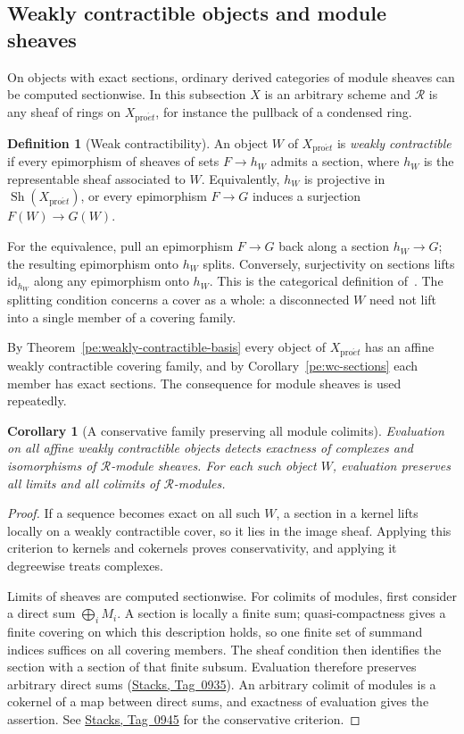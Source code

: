 \documentclass[11pt,a4paper]{article}
\numberwithin{equation}{section}
\newtheorem{corollary}[theorem]{Corollary}
\theoremstyle{definition}
\newtheorem{definition}[theorem]{Definition}
\theoremstyle{remark}
\newcommand{\Sh}{\operatorname{Sh}}
\newcommand{\proet}{\mathrm{pro}\acute{e}t}
\newcommand{\stacks}[1]{\href{https://stacks.math.columbia.edu/tag/#1}{\textnormal{Stacks, Tag~#1}}}
\begin{document}
\subsection{Weakly contractible objects and module sheaves}
\label{pe:sec-homological}

On objects with exact sections, ordinary derived categories of module
sheaves can be computed sectionwise. In this subsection $X$ is an
arbitrary scheme and $\mathcal R$ is any sheaf of rings on $X_{\proet}$,
for instance the pullback of a condensed ring.

\begin{definition}[Weak contractibility]\label{pe:weak-contractible}
An object $W$ of $X_{\proet}$ is \emph{weakly contractible} if every
epimorphism of sheaves of sets $F\to h_W$ admits a section, where $h_W$
is the representable sheaf associated to $W$. Equivalently, $h_W$ is
projective in $\Sh(X_{\proet})$, or every epimorphism $F\to G$ induces a
surjection $F(W)\to G(W)$.
\end{definition}

For the equivalence, pull an epimorphism $F\to G$ back along a section
$h_W\to G$; the resulting epimorphism onto $h_W$ splits. Conversely,
surjectivity on sections lifts $\mathrm{id}_{h_W}$ along any
epimorphism onto $h_W$. This is the categorical definition
of~\cite[\S3.2]{BS}. The splitting condition concerns a cover as a
whole: a disconnected $W$ need not lift into a single member of a
covering family.

By Theorem~\ref{pe:weakly-contractible-basis} every object of
$X_{\proet}$ has an affine weakly contractible covering family, and by
Corollary~\ref{pe:wc-sections} each member has exact sections. The
consequence for module sheaves is used repeatedly.

\begin{corollary}[A conservative family preserving all module colimits]
\label{pe:sections}
Evaluation on all affine weakly contractible objects detects exactness
of complexes and isomorphisms of $\mathcal R$-module sheaves.
For each such object $W$, evaluation preserves all limits and all
colimits of $\mathcal R$-modules.
\end{corollary}
\begin{proof}
If a sequence becomes exact on all such $W$, a section in a kernel
lifts locally on a weakly contractible cover, so it lies in the
image sheaf. Applying this criterion to kernels and cokernels proves
conservativity, and applying it degreewise treats complexes.

Limits of sheaves are computed sectionwise. For colimits of
modules, first consider a direct sum $\bigoplus_i M_i$. A section is
locally a finite sum; quasi-compactness gives a finite covering on which
this description holds, so one finite set of summand indices
suffices on all covering members. The sheaf condition then identifies
the section with a section of that finite subsum. Evaluation therefore
preserves arbitrary direct sums (\stacks{0935}). An arbitrary
colimit of modules is a cokernel of a map between direct sums, and
exactness of evaluation gives the assertion. See \stacks{0945} for
the conservative criterion.
\end{proof}
\end{document}
